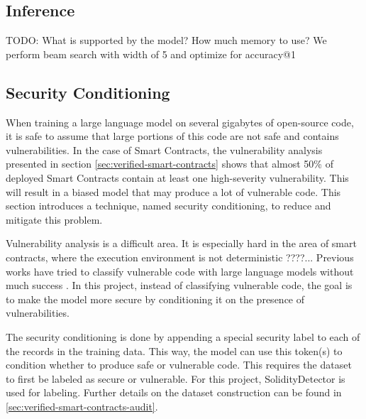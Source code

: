 \subsection{Inference}

TODO: What is supported by the model? How much memory to use?
We perform beam search with width of 5 and optimize for accuracy@1


\subsection{Security Conditioning}
\label{sec:security-conditioning}
When training a large language model on several gigabytes of open-source code, it is safe to assume that large portions of this code are not safe and contains vulnerabilities. In the case of Smart Contracts, the vulnerability analysis presented in section \ref{sec:verified-smart-contracts} shows that almost 50\% of deployed Smart Contracts contain at least one high-severity vulnerability. This will result in a biased model that may produce a lot of vulnerable code. This section introduces a technique, named security conditioning, to reduce and mitigate this problem.

Vulnerability analysis is a difficult area. It is especially hard in the area of smart contracts, where the execution environment is not deterministic ????... Previous works have tried to classify vulnerable code with large language models without much success . In this project, instead of classifying vulnerable code, the goal is to make the model more secure by conditioning it on the presence of vulnerabilities.

The security conditioning is done by appending a special security label to each of the records in the training data. This way, the model can use this token(s) to condition whether to produce safe or vulnerable code. This requires the dataset to first be labeled as secure or vulnerable. For this project, SolidityDetector is used for labeling. Further details on the dataset construction can be found in \cref{sec:verified-smart-contracts-audit}.


